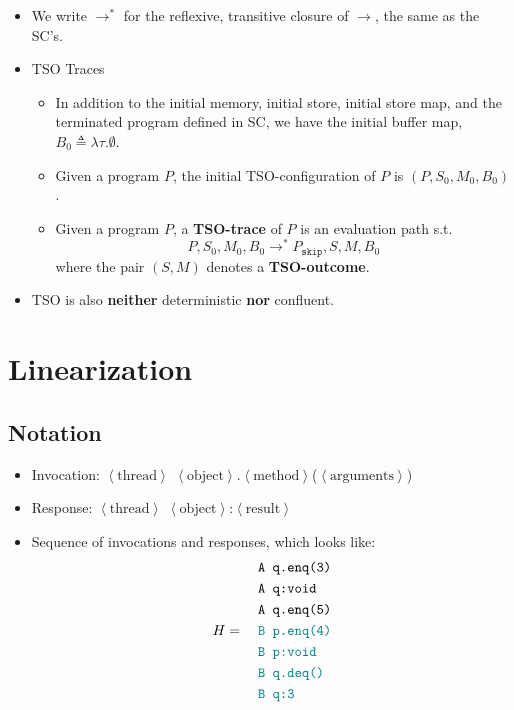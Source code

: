 \documentclass[twocolumn,landscape,10pt]{article}
\theoremstyle{definition}
\begin{document}
\begin{itemize}
    \item We write $\rightarrow^{*}$ for the reflexive, transitive closure of
        $\rightarrow$, the same as the SC's.
    \item TSO Traces
        \begin{itemize}
            \item In addition to the initial memory, initial store, initial
                store map, and the terminated program defined in SC, we have the
                initial buffer map, $B_0\triangleq\lambda\tau.\emptyset$.
            \item Given a program $P$, the initial TSO-configuration of $P$ is
                $(P,S_0,M_0,B_0)$.
            \item Given a program $P$, a \textbf{TSO-trace} of $P$ is an
                evaluation path s.t.
                \[
                    P,S_0,M_0,B_0\rightarrow^* P_\texttt{skip},S,M,B_0
                \]
                where the pair $(S,M)$ denotes a \textbf{TSO-outcome}.
        \end{itemize} 
    \item TSO is also \textbf{neither} deterministic \textbf{nor} confluent.
\end{itemize}

\newpage
\section{Linearization}

\subsection{Notation}

\begin{itemize}
    \item{} Invocation:
        $\left\langle\text{thread}\right\rangle$
        $\left\langle\text{object}\right\rangle$.$\left\langle\text{method}\right\rangle$($\left\langle\text{arguments}\right\rangle$)
    \item{} Response:
        $\left\langle\text{thread}\right\rangle$
        $\left\langle\text{object}\right\rangle$:$\left\langle\text{result}\right\rangle$
    \item{} Sequence of invocations and responses,
        which looks like:
        \[
            H = \quad\begin{align}
                &\texttt{A q.enq(3)} \\
                &\texttt{A q:void} \\
                &\texttt{A q.enq(5)} \\
                &\textcolor{teal}{\texttt{B p.enq(4)}} \\
                &\textcolor{teal}{\texttt{B p:void}} \\
                &\textcolor{teal}{\texttt{B q.deq()}} \\
                &\textcolor{teal}{\texttt{B q:3}} \\
            \end{align} 
        \]
\end{itemize} 
\end{document}
